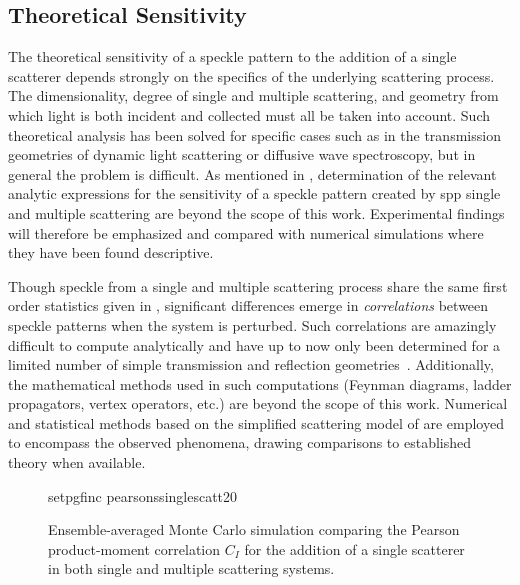 \subsection{Theoretical Sensitivity}
The theoretical sensitivity of a speckle pattern to the addition of a single
scatterer depends strongly on the specifics of the underlying scattering
process.  The dimensionality, degree of single and multiple scattering, and
geometry from which light is both incident and collected must all be taken
into account.  Such theoretical analysis has been solved for specific cases
such as in the transmission geometries of dynamic light scattering or
diffusive wave spectroscopy, but in general the problem is difficult.  As
mentioned in , determination of the relevant analytic
expressions for the sensitivity of a speckle pattern created by \gls{spp} single and
multiple scattering are beyond the scope of this work.  Experimental findings
will therefore be emphasized and compared with numerical simulations where
they have been found descriptive.

Though speckle from a single and multiple scattering process share the same
first order statistics given in , significant differences
emerge in \textit{correlations} between speckle patterns when the system is
perturbed.  Such correlations are amazingly difficult to compute analytically
and have up to now only been determined for a limited number of simple
transmission and reflection geometries~\cite{berkovits1994correlations}.
Additionally, the mathematical methods used in such computations (Feynman
diagrams, ladder propagators, vertex operators, etc.) are beyond the scope of
this work.  Numerical and statistical methods based on the simplified
scattering model of  are employed
to encompass the observed phenomena, drawing comparisons to established theory
when available.

\begin{figure}
  \centering
  {setpgfinc}
  {pearsonssinglescatt20}
  \caption{Ensemble-averaged Monte Carlo simulation comparing the Pearson
    product-moment correlation $C_I$ for the addition of a single scatterer in
    both single and multiple scattering systems.}
  \label{fig:scatteringpearson}
\end{figure}

